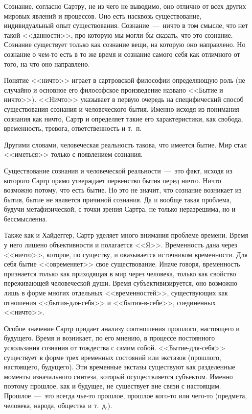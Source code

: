 \documentclass{bmstu}
\begin{document}
Сознание, согласно Сартру, не из чего не выводимо, оно отлично от всех других мировых явлений и процессов. Оно есть насквозь существование, индивидуальный опыт существования. Сознание~---~ничто в том смысле, что нет такой <<данности>>, про которую мы могли бы сказать, что это сознание. Сознание существует только как сознание вещи, на которую оно направлено. Но сознание о чем-то есть в то же время и сознание самого себя как отличного от того, на что оно направлено.

Понятие <<ничто>> играет в сартровской философии определяющую роль (не случайно и основное его философское произведение названо <<Бытие и ничто>>). <<Ничто>> указывает в первую очередь на специфический способ существования сознания и человеческого бытия. Именно исходя из понимания сознания как ничто, Сартр и определяет такие его характеристики, как свобода, временность, тревога, ответственность и т.~п.

Другими словами, человеческая реальность такова, что имеется бытие. Мир стал <<иметься>> только с появлением сознания.

Существование сознания и человеческой реальности~---~это факт, исходя из которого Сартр прямо утверждает первенство бытия перед ничто. Ничто возможно потому, что есть бытие. Но это не значит, что сознание возникает из бытия, бытие не является причиной сознания. Да и вообще такая проблема, будучи метафизической, с точки зрения Сартра, не только неразрешима, но и бессмысленна.

Также как и Хайдеггер, Сартр уделяет много внимания проблеме времени. Время у него лишено объективности и полагается <<Я>>. Временность дана через <<ничто>>, которое, по существу, и оказывается источником временности. Для себя бытие <<овременяет>> свое существование. Иначе говоря, временность признается только как приходящая в мир через человека, только как свойство переживающей человеческой души. Время субъективизируется, оно возможно лишь в форме многих отдельных <<временностей>>, существующих как отношения <<бытия-для-себя>> и <<бытия-в-себе>>, соединенных <<ничто>>.

Особое значение Сартр придает анализу соотношения прошлого, настоящего и будущего. Время и возникает, по его мнению, в процессе постоянного ускользания сознания от тождества с самим собой. <<Бытие-для-себя>> существует в форме трех временных состояний или экстазов (прошлого, настоящего, будущего). Эти временные экстазы существуют как разделенные моменты изначального синтеза, который осуществляется субъектом. Именно поэтому прошлое, как и будущее, не существует вне связи с настоящим. Прошлое~---~это всегда чье-то прошлое, прошлое кого-то или чего-то (предмета, человека, народа, общества и т.~д.).
\end{document}
